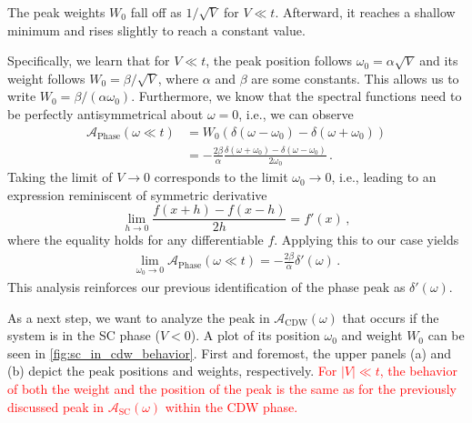 \documentclass[
    reprint, 
    aps,
    preprintnumbers,
    twocolumn,
    prb,
    superscriptaddress
]{revtex4-2}
\newcommand{\spectral}[1]{\mathcal{A}_\text{#1}  (\omega)}
\newcommand{\markEdited}{red}
\begin{document}
The peak weights $W_0$ fall off as $1/\sqrt{V}$ for $V \ll t$. 
Afterward, it reaches a shallow minimum and rises slightly to reach a constant value.

Specifically, we learn that for $V \ll t$, the peak position follows $\omega_0 = \alpha \sqrt{V}$ and its weight follows $W_0 = \beta / \sqrt{V}$, 
where $\alpha$ and $\beta$ are some constants.
This allows us to write $W_0 = \beta / (\alpha \omega_0)$. 
Furthermore, we know that the spectral functions need to be perfectly antisymmetrical about $\omega = 0$, i.e., we can observe
\begin{align}
    \mathcal{A}_\text{Phase} (\omega \ll t) &= W_0 (\delta (\omega - \omega_0) - \delta (\omega + \omega_0)) \nonumber \\
        &= - \frac{2\beta}{\alpha} \frac{\delta (\omega + \omega_0) - \delta (\omega - \omega_0)}{2\omega_0} \,.
\end{align} 
Taking the limit of $V \to 0$ corresponds to the limit $\omega_0 \to 0$, i.e., leading to an expression reminiscent of symmetric derivative
\begin{equation}
    \lim_{h \to 0} \frac{f(x + h) - f(x - h)}{2h} = f'(x)\,,
\end{equation}
where the equality holds for any differentiable $f$.
Applying this to our case yields
\begin{align}
    \lim_{\omega_0 \to 0} \mathcal{A}_\text{Phase} (\omega \ll t) = - \frac{2 \beta}{\alpha} \delta'(\omega)\,.
\end{align}
This analysis reinforces our previous identification of the phase peak as $\delta' (\omega)$.


As a next step, we want to analyze the peak in $\spectral{CDW}$ that occurs if the system is in the SC phase ($V<0$).
A plot of its position $\omega_0$ and weight $W_0$ can be seen in \autoref{fig:sc_in_cdw_behavior}.
First and foremost, the upper panels (a) and (b) depict the peak positions and weights, respectively.
\textcolor{\markEdited}{For $|V| \ll t$, the behavior of both the weight and the position of the peak is the same as for the previously discussed peak in $\spectral{SC}$ within the CDW phase.}
\end{document}
